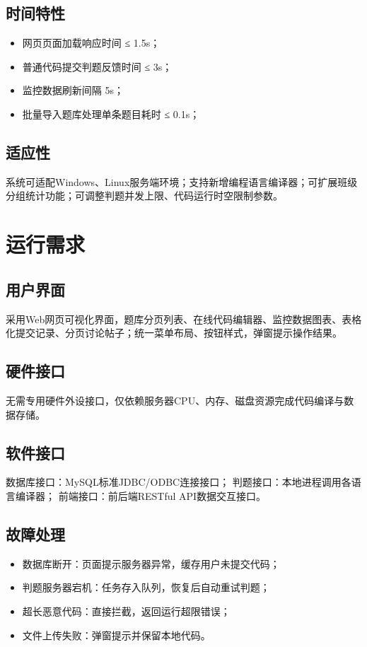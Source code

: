 \documentclass{../template/softeng}
\begin{document}
\subsection{时间特性}
\begin{itemize}
    \item 网页页面加载响应时间 ≤ 1.5s；
    \item 普通代码提交判题反馈时间 ≤ 3s；
    \item 监控数据刷新间隔 5s；
    \item 批量导入题库处理单条题目耗时 ≤ 0.1s；
\end{itemize}

\subsection{适应性}
系统可适配Windows、Linux服务端环境；支持新增编程语言编译器；可扩展班级分组统计功能；可调整判题并发上限、代码运行时空限制参数。

\section{运行需求}
\subsection{用户界面}
采用Web网页可视化界面，题库分页列表、在线代码编辑器、监控数据图表、表格化提交记录、分页讨论帖子；统一菜单布局、按钮样式，弹窗提示操作结果。

\subsection{硬件接口}
无需专用硬件外设接口，仅依赖服务器CPU、内存、磁盘资源完成代码编译与数据存储。

\subsection{软件接口}
数据库接口：MySQL标准JDBC/ODBC连接接口；
判题接口：本地进程调用各语言编译器；
前端接口：前后端RESTful API数据交互接口。

\subsection{故障处理}
\begin{itemize}
    \item 数据库断开：页面提示服务器异常，缓存用户未提交代码；
    \item 判题服务器宕机：任务存入队列，恢复后自动重试判题；
    \item 超长恶意代码：直接拦截，返回运行超限错误；
    \item 文件上传失败：弹窗提示并保留本地代码。
\end{itemize}
\end{document}
